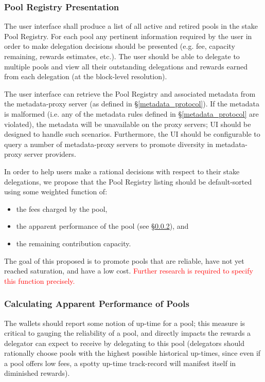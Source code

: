 \subsubsection{Pool Registry Presentation} \label{registry_presentation}
The user interface shall produce a list of all active and retired pools in the stake Pool Registry. For each pool any pertinent information required by the user in order to make delegation decisions should be presented (e.g. fee, capacity remaining, rewards estimates, etc.). The user should be able to delegate to multiple pools and view all their outstanding delegations and rewards earned from each delegation (at the block-level resolution). 

The user interface can retrieve the Pool Registry and associated metadata from the metadata-proxy server (as defined in \S\ref{metadata_protocol}). If the metadata is malformed (i.e. any of the metadata rules defined in \S\ref{metadata_protocol} are violated), the metadata will be unavailable on the proxy servers; UI should be designed to handle such scenarios. Furthermore, the UI should be configurable to query a number of metadata-proxy servers to promote diversity in metadata-proxy server providers. 

In order to help users make a rational decisions with respect to their stake delegations, we propose that the Pool Registry listing should be default-sorted using some weighted function of:  
\begin{itemize}[label=--,nosep]
    \item the fees charged by the pool, 
    \item the apparent performance of the pool (see \S\ref{apparent_perf}), and
    \item the remaining contribution capacity.
\end{itemize}
The goal of this proposed  is to promote pools that are reliable, have not yet reached saturation, and have a low cost. \textcolor{red}{Further research is required to specify this function precisely.}  

\subsubsection{Calculating Apparent Performance of Pools} \label{apparent_perf}

The wallets should report some notion of up-time for a pool; this measure is critical to gauging the reliability of a pool, and directly impacts the rewards a delegator can expect to receive by delegating to this pool (delegators should rationally choose pools with the highest possible historical up-times, since even if a pool offers low fees, a spotty up-time track-record will manifest itself in diminished rewards). 

